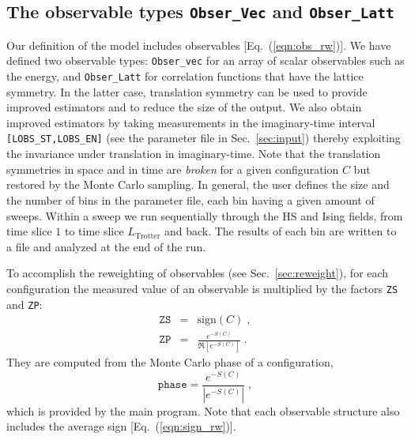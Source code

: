 \documentclass{SciPost}
\begin{document}
\subsection{The observable types \texttt{Obser\_Vec} and \texttt{Obser\_Latt}}\label{sec:obs}
%
Our definition  of the model includes observables [Eq.~(\ref{eqn:obs_rw})]. We have defined two observable types: \texttt{Obser\_vec}  for an array of scalar observables
such as the energy, and  \texttt{Obser\_Latt}   for correlation functions that have the lattice symmetry. In the latter case, translation symmetry can be used to provide improved estimators and to reduce the size of the output.   
We also obtain improved estimators by taking measurements in the imaginary-time interval \texttt{[LOBS\_ST,LOBS\_EN]}  (see the parameter file in Sec.~\ref{sec:input}) thereby exploiting the invariance under translation in imaginary-time.
Note that the translation symmetries  in space and in time are \textit{broken} for a given  configuration $C$ but restored by the Monte Carlo sampling. 
In general, the user defines the size and  the number of bins in the parameter file, each bin having a given amount of sweeps. Within a sweep we run sequentially through the HS and Ising fields, from time slice $1$ to time slice $L_{\text{Trotter}}$ and back.  The results of each bin are written to a file  and analyzed at the end of the run.     

To accomplish the reweighting of observables (see Sec.~\ref{sec:reweight}), for each configuration the measured value of an observable is multiplied by the factors \texttt{ZS} and \texttt{ZP}:
\begin{eqnarray}
\texttt{ZS} &=& \text{sign}(C)\;,\\
\texttt{ZP} &=& \frac{e^{-S(C)}} {\Re \left[e^{-S(C)} \right]}\;.
\end{eqnarray}
They are computed from the Monte Carlo phase of a configuration,
\begin{equation}\label{eqn:phase}
	\texttt{phase}   =   \frac{e^{-S(C)}}{ \left| e^{-S(C) }\right| }\;,
\end{equation}
which is provided by the main program.
Note that each observable structure also includes the average sign [Eq.~(\ref{eqn:sign_rw})].
%
\end{document}
